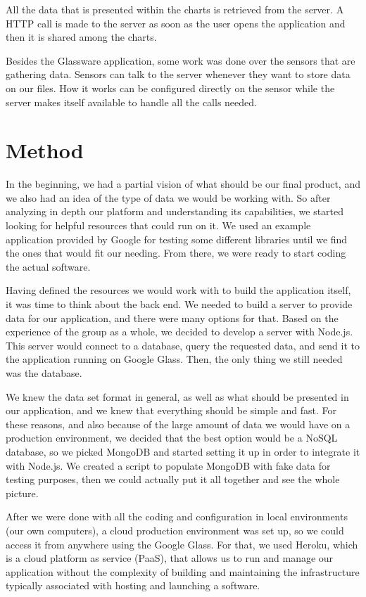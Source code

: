 \documentclass[a4paper,11pt]{article}
\begin{document}
All the data that is presented within the charts is retrieved from the server. A HTTP call is made to the server as soon as the user opens the application and then it is shared among the charts. 

Besides the Glassware application, some work was done over the sensors that are gathering data. Sensors can talk to the server whenever they want to store data on our files. How it works can be configured directly on the sensor while the server makes itself available to handle all the calls needed.

\section {Method}

In the beginning, we had a partial vision of what should be our final product, and we also had an idea of the type of data we would be working with. So after analyzing in depth our platform and understanding its capabilities, we started looking for helpful resources that could run on it. We used an example application provided by Google for testing some different libraries until we find the ones that would fit our needing. From there, we were ready to start coding the actual software.

Having defined the resources we would work with to build the application itself, it was time to think about the back end. We needed to build a server to provide data for our application, and there were many options for that. Based on the experience of the group as a whole, we decided to develop a server with Node.js. This server would connect to a database, query the requested data, and send it to the application running on Google Glass. Then, the only thing we still needed was the database.

We knew the data set format in general, as well as what should be presented in our application, and we knew that everything should be simple and fast. For these reasons, and also because of the large amount of data we would have on a production environment, we decided that the best option would be a NoSQL database, so we picked MongoDB and started setting it up in order to integrate it with Node.js. We created a script to populate MongoDB with fake data for testing purposes, then we could actually put it all together and see the whole picture.

After we were done with all the coding and configuration in local environments (our own computers), a cloud production environment was set up, so we could access it from anywhere using the Google Glass. For that, we used Heroku, which is a cloud platform as service (PaaS), that allows us to run and manage our application without the complexity of building and maintaining the infrastructure typically associated with hosting and launching a software.
\end{document}
